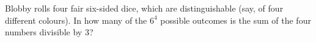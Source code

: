 Blobby rolls four fair six-sided dice, which are distinguishable (say, of four different colours). In how many of the $6^4$ possible outcomes is the sum of the four numbers divisible by $3$?
